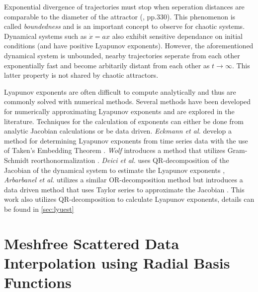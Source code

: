         \begin{remark}
            Exponential divergence of trajectories must stop when seperation distances are comparable to the diameter of the
            attractor (\cite{item:2}, pp.330). This phenomenon is called \textit{boundedness} and is an important concept
            to observe for chaotic systems. Dynamical systems such as $\dot{x}=ax$ also exhibit sensitive dependance on
            initial conditions (and have positive Lyapunov exponents). However, the aforementioned dynamical system is unbounded, nearby trajectories seperate
            from each other exponentially fast and become arbitarily distant from each other as $t\to\infty$. This latter property is not shared by
            chaotic attractors.
        \end{remark}


          Lyapunov exponents are often difficult to compute analytically and thus are commonly solved with numerical
         methods. Several methods have been developed for numerically approximating Lyapunov exponents and are explored in the literature. Techniques
          for the calculation of exponents can either be done from analytic Jacobian calculations or be data driven. \textit{Eckmann et al.}
          develop a method for determining Lyapunov exponents from time series data with the use of Taken's Embedding
          Theorem \cite{item:18}. \textit{Wolf} introduces a method that utilizes Gram-Schmidt reorthonormalization \cite{item:4}.
          \textit{Deici et al.} uses QR-decomposition of the Jacobian of the dynamical system to estimate
          the Lyapunov exponents \cite{item:7}, \textit{Arbarbanel et al.} utilizes a similar OR-decomposition method but introduces a data
          driven method that uses Taylor series to approximate the Jacobian \cite{item:5}. This work also utilizes
        QR-decomposition to calculate Lyapunov exponents, details can be found in \textsection\ref{sec:lyuest}\\

  \section{Meshfree Scattered Data Interpolation using Radial Basis Functions}\label{sec:rbf}

